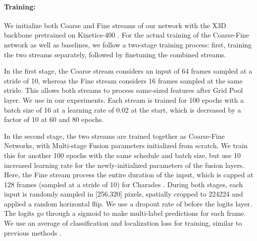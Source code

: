 \documentclass[final]{cvpr}
\begin{document}
\vspace{-3pt}
\paragraph{Training:} We initialize both Coarse and Fine streams of our network with the X3D backbone pretrained on Kinetics-400 \cite{kay2017kinetics}. For the actual training of the Coarse-Fine network as well as baselines, we follow a two-stage training process: first, training the two streams separately, followed by finetuning the combined streams. 

In the first stage, the Coarse stream considers an input of 64 frames sampled at a stride of 10, whereas the Fine stream considers 16 frames sampled at the same stride. This allows both streams to process same-sized features after Grid Pool layer. We use  in our experiments. Each stream is trained for 100 epochs with a batch size of 16 at a learning rate of 0.02 at the start, which is decreased by a factor of 10 at 60 and 80 epochs.

In the second stage, the two streams are trained together as Coarse-Fine Networks, with Multi-stage Fusion parameters initialized from scratch. We train this for another 100 epochs with the same schedule and batch size, but use 10 increased learning rate for the newly-initialized parameters of the fusion layers. Here, the Fine stream process the entire duration of the input, which is capped at 128 frames (sampled at a stride of 10) for Charades \cite{sigurdsson2016hollywood}. During both stages, each input is randomly sampled in [256,320] pixels, spatially cropped to 224224 and applied a random horizontal flip. We use a dropout rate of  before the logits layer. The logits go through a sigmoid to make multi-label predictions for each frame. We use an average of classification and localization loss for training, similar to previous methods \cite{piergiovanni2018learning,piergiovanni2019temporal}.

\vspace{-3pt}
\end{document}
